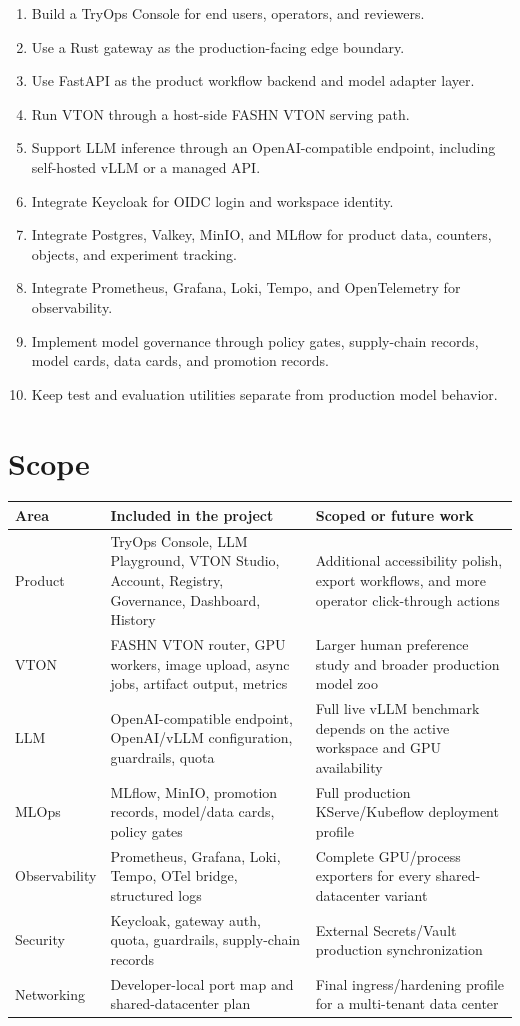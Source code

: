 \documentclass[12pt,a4paper,oneside]{report}
\begin{document}
\begin{enumerate}
  \item Build a TryOps Console for end users, operators, and reviewers.
  \item Use a Rust gateway as the production-facing edge boundary.
  \item Use FastAPI as the product workflow backend and model adapter layer.
  \item Run VTON through a host-side FASHN VTON serving path.
  \item Support LLM inference through an OpenAI-compatible endpoint, including self-hosted vLLM or a managed API.
  \item Integrate Keycloak for OIDC login and workspace identity.
  \item Integrate Postgres, Valkey, MinIO, and MLflow for product data, counters, objects, and experiment tracking.
  \item Integrate Prometheus, Grafana, Loki, Tempo, and OpenTelemetry for observability.
  \item Implement model governance through policy gates, supply-chain records, model cards, data cards, and promotion records.
  \item Keep test and evaluation utilities separate from production model behavior.
\end{enumerate}

\section{Scope}

\begin{longtable}{p{3.2cm}p{5.9cm}p{5.9cm}}
\toprule
\textbf{Area} & \textbf{Included in the project} & \textbf{Scoped or future work} \\
\midrule
Product & TryOps Console, LLM Playground, VTON Studio, Account, Registry, Governance, Dashboard, History & Additional accessibility polish, export workflows, and more operator click-through actions \\
VTON & FASHN VTON router, GPU workers, image upload, async jobs, artifact output, metrics & Larger human preference study and broader production model zoo \\
LLM & OpenAI-compatible endpoint, OpenAI/vLLM configuration, guardrails, quota & Full live vLLM benchmark depends on the active workspace and GPU availability \\
MLOps & MLflow, MinIO, promotion records, model/data cards, policy gates & Full production KServe/Kubeflow deployment profile \\
Observability & Prometheus, Grafana, Loki, Tempo, OTel bridge, structured logs & Complete GPU/process exporters for every shared-datacenter variant \\
Security & Keycloak, gateway auth, quota, guardrails, supply-chain records & External Secrets/Vault production synchronization \\
Networking & Developer-local port map and shared-datacenter plan & Final ingress/hardening profile for a multi-tenant data center \\
\bottomrule
\end{longtable}
\end{document}
